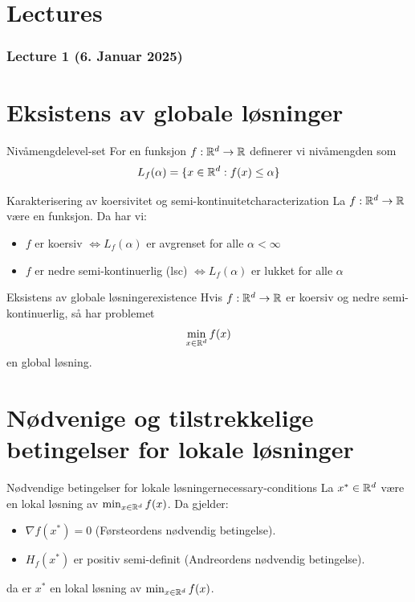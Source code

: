 \section{Lectures}

\subsubsection{Lecture 1 (6. Januar 2025)}

\section*{Eksistens av globale løsninger}

\begin{definition}{Nivåmengde}{level-set}
  For en funksjon  \(f: \mathbb{R}^d \to \mathbb{R}\) definerer vi nivåmengden som
  \[
    L_f(\alpha) = \{x \in \mathbb{R}^d : f(x) \leq \alpha\}
  \]
\end{definition}

\begin{theorem}{Karakterisering av koersivitet og semi-kontinuitet}{characterization}
  La  \(f: \mathbb{R}^d \to \mathbb{R}\) være en funksjon. Da har vi:
  \begin{itemize}
    \item  \(f\) er koersiv  \(\iff L_f(\alpha)\) er avgrenset for alle  \(\alpha < \infty\)
    \item  \(f\) er nedre semi-kontinuerlig (lsc)  \(\iff L_f(\alpha)\) er lukket for alle  \(\alpha\)
  \end{itemize}
\end{theorem}

\begin{theorem}{Eksistens av globale løsninger}{existence}
  Hvis  \(f: \mathbb{R}^d \to \mathbb{R}\) er koersiv og nedre semi-kontinuerlig, så har problemet
  \[
    \min_{x \in \mathbb{R}^d} f(x)
  \]
  en global løsning.
\end{theorem}

\section*{Nødvenige og tilstrekkelige betingelser for lokale løsninger}

\begin{theorem}{Nødvendige betingelser for lokale løsninger}{necessary-conditions}
  La  \(x^* \in \mathbb{R}^d\) være en lokal løsning av  \(\min_{x \in \mathbb{R}^d} f(x)\). Da gjelder:
  \begin{itemize}
    \item  \(\nabla f(x^*) = 0\) (Førsteordens nødvendig betingelse).
    \item  \(H_f(x^*)\) er positiv semi-definit (Andreordens nødvendig betingelse).
  \end{itemize}
  da er \(x^*\) en lokal løsning av  \(\min_{x \in \mathbb{R}^d} f(x)\).
\end{theorem}\label{thm:necessary-conditions}

